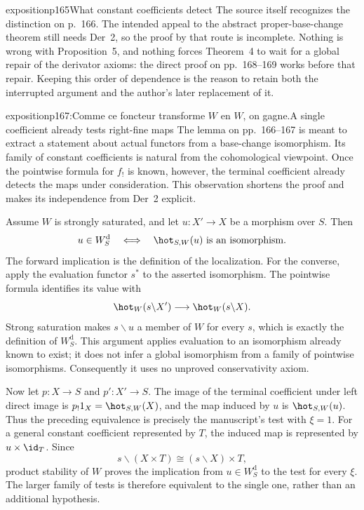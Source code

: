 \begin{dcomment}{exposition}{p165}{What constant coefficients detect}
The source itself recognizes the distinction on p.~166. The intended appeal to the abstract proper-base-change theorem still needs Der~2, so the proof by that route is incomplete. Nothing is wrong with Proposition~5, and nothing forces Theorem~4 to wait for a global repair of the derivator axioms: the direct proof on pp.~168--169 works before that repair. Keeping this order of dependence is the reason to retain both the interrupted argument and the author's later replacement of it.
\end{dcomment}

\begin{dcomment}{exposition}{p167:Comme ce foncteur transforme $W$ en $W$, on gagne.}{A single coefficient already tests right-fine maps}
The lemma on pp.~166--167 is meant to extract a statement about actual functors from a base-change isomorphism. Its family of constant coefficients is natural from the cohomological viewpoint. Once the pointwise formula for $f_!$ is known, however, the terminal coefficient already detects the maps under consideration. This observation shortens the proof and makes its independence from Der~2 explicit.

Assume $W$ is strongly saturated, and let $u:X'\to X$ be a morphism over $S$. Then
\[
 u\in W_S^{\mathrm d}
 \quad\Longleftrightarrow\quad
 \hot_{S,W}(u)\text{ is an isomorphism}.
\]
The forward implication is the definition of the localization. For the converse, apply the evaluation functor $s^*$ to the asserted isomorphism. The pointwise formula identifies its value with
\[
 \hot_W(s\backslash X')\longrightarrow\hot_W(s\backslash X).
\]
Strong saturation makes $s\backslash u$ a member of $W$ for every $s$, which is exactly the definition of $W_S^{\mathrm d}$. This argument applies evaluation to an isomorphism already known to exist; it does not infer a global isomorphism from a family of pointwise isomorphisms. Consequently it uses no unproved conservativity axiom.

Now let $p:X\to S$ and $p':X'\to S$. The image of the terminal coefficient under left direct image is $p_!1_X=\hot_{S,W}(X)$, and the map induced by $u$ is $\hot_{S,W}(u)$. Thus the preceding equivalence is precisely the manuscript's test with $\xi=1$. For a general constant coefficient represented by $T$, the induced map is represented by $u\times\id_T$. Since
\[
 s\backslash(X\times T)\cong(s\backslash X)\times T,
\]
product stability of $W$ proves the implication from $u\in W_S^{\mathrm d}$ to the test for every $\xi$. The larger family of tests is therefore equivalent to the single one, rather than an additional hypothesis.


\end{dcomment}
